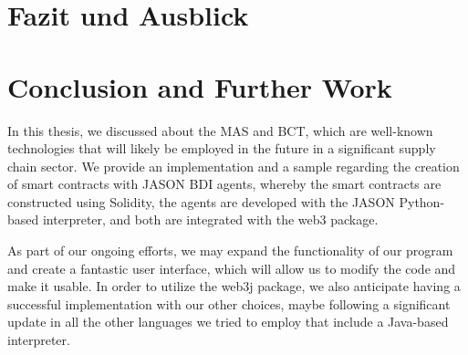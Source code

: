 {\chapter{Fazit und Ausblick}}
{\chapter{Conclusion and Further Work}}

\label{sec:conclusion}

In this thesis, we discussed about the \ac{MAS} and \ac{BCT}, which are well-known technologies that will likely be employed in the future in a significant supply chain sector. We provide an implementation and a sample regarding the creation of smart contracts with JASON \ac{BDI} agents, whereby the smart contracts are constructed using Solidity, the agents are developed with the JASON Python-based interpreter, and both are integrated with the web3 package.

\vspace{.5cm}

As part of our ongoing efforts, we may expand the functionality of our program and create a fantastic user interface, which will allow us to modify the code and make it usable. In order to utilize the web3j package, we also anticipate having a successful implementation with our other choices, maybe following a significant update in all the other languages we tried to employ that include a Java-based interpreter.